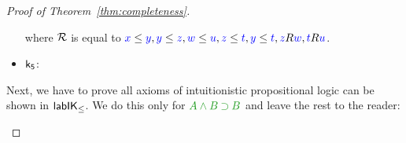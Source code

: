 \begin{proof}[Proof of Theorem~\ref{thm:completeness}]
\begin{itemize}
\begin{smallequation*}
{{{{{						{\vliin {\llabrn{\IMP}}
							{}
							{}
							{\vlin {\rlabrn{\DIA}}
									{}
									{}
									{
										{}
										{}
										{
											{}
											{}
											{\vlhy {}}}}}
							{
								{}
								{}
								{\vlin {\llabrn{\BOX}}
									{}
									{}
									{
										{}
										{}
										{
											{}
											{}
											{\vlhy {}}}}}}}}}}}}
    \end{smallequation*}

where $\B$ is equal to $\futs xy, \futs yz, \futs wu, \futs zt, \futs yt, \accs zw, \accs tu$.
\item $\kax[5]$:
  \begin{smallequation*}
    \end{smallequation*}
    
  \end{itemize}
  Next, we have to prove all axioms of intuitionistic propositional logic can be shown in $\labIKp$. We do this only for $\fm{A \AND B \IMP B}$ and leave the rest to the reader:
  \begin{smallequation*}
    \end{smallequation*}
    

\end{proof}
